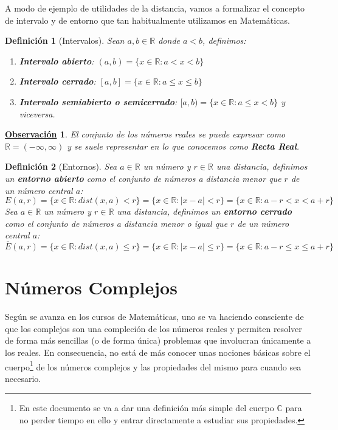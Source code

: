 \documentclass[10pt,a4paper,openright]{book}
\theoremstyle{break}
\newtheorem{defi}{Definición}[chapter]
\newtheorem{obs}{\underline{Observación}}[chapter]
\begin{document}
A modo de ejemplo de utilidades de la distancia, vamos a formalizar el concepto de intervalo y de entorno que tan habitualmente utilizamos en Matemáticas.

\begin{defi}[Intervalos]
Sean $a,b\in \mathbb R$ donde $a<b$, definimos:
\begin{enumerate}
\item \textbf{Intervalo abierto}: $(a,b)=\{x\in \mathbb R: a<x<b\}$
\item \textbf{Intervalo cerrado}: $[a,b]=\{x\in \mathbb R: a\leq x\leq b\}$
\item \textbf{Intervalo semiabierto o semicerrado}: $[a,b)=\{x\in \mathbb R: a\leq x<b\}$ y viceversa.
\end{enumerate}
\end{defi}

\begin{obs}
El conjunto de los números reales se puede expresar como $\mathbb R=(-\infty,\infty)$ y se suele representar en lo que conocemos como \textbf{Recta Real}.
\end{obs}

\begin{defi}[Entornos]
Sea $a\in \mathbb{R}$ un número y $r\in \mathbb{R}$ una distancia, definimos un \textbf{entorno abierto} como el conjunto de números a distancia menor que $r$ de un número central $a$:
$$E(a,r)=\{x\in \mathbb R : dist(x,a)<r\}=\{x\in \mathbb R :|x-a|<r\}=\{x\in \mathbb R :a-r<x<a+r\}$$
Sea $a\in \mathbb{R}$ un número y $r\in \mathbb{R}$ una distancia, definimos un \textbf{entorno cerrado} como el conjunto de números a distancia menor o igual que $r$ de un número central $a$:
$$\bar{E}(a,r)=\{x\in \mathbb R : dist(x,a)\leq r\}=\{x\in \mathbb R :|x-a|\leq r\}=\{x\in \mathbb R :a-r\leq x\leq a+r\}$$
\end{defi}

\section{Números Complejos}
Según se avanza en los cursos de Matemáticas, uno se va haciendo consciente de que los complejos son una compleción de los números reales y permiten resolver de forma más sencillas (o de forma única) problemas que involucran únicamente a los reales. En consecuencia, no está de más conocer unas nociones básicas sobre el cuerpo\footnote{En este documento se va a dar una definición más simple del cuerpo $\mathbb{C}$ para no perder tiempo en ello y entrar directamente a estudiar sus propiedades.} de los números complejos y las propiedades del mismo para cuando sea necesario.
\end{document}
